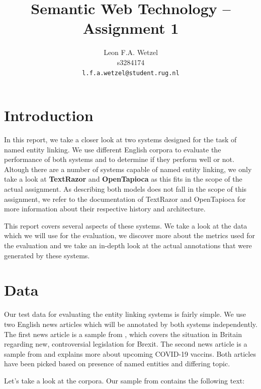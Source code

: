 \documentclass[a4paper, 11pt]{article}
\title{Semantic Web Technology -- Assignment 1}
\author{Leon F.A. Wetzel\\s3284174\\ \texttt{l.f.a.wetzel@student.rug.nl}}
\begin{document}
\maketitle

\section{Introduction}

In this report, we take a closer look at two systems designed for the task of named entity linking. We use different English corpora to evaluate the performance of both systems and to determine if they perform well or not. Altough there are a number of systems capable of named entity linking, we only take a look at \textbf{TextRazor} and \textbf{OpenTapioca} as this fits in the scope of the actual assignment. As describing both models does not fall in the scope of this assignment, we refer to the documentation of TextRazor \citep{crayston_2020} and OpenTapioca \citep{DBLP:journals/corr/abs-1904-09131} for more information about their respective history and architecture.

This report covers several aspects of these systems. We take a look at the data which we will use for the evaluation, we discover more about the metrics used for the evaluation and we take an in-depth look at the actual annotations that were generated by these systems.

\section{Data}

Our test data for evaluating the entity linking systems is fairly simple. We use two English news articles which will be annotated by both systems independently. The first news article is a sample from \citet{mcgee_2020}, which covers the situation in Britain regarding new, controversial legislation for Brexit. The second news article is a sample from \citet{mckeever_2020} and explains more about upcoming COVID-19 vaccins. Both articles have been picked based on presence of named entities and differing topic.

Let's take a look at the corpora. Our sample from \citet{mcgee_2020} contains the following text:

\end{document}
